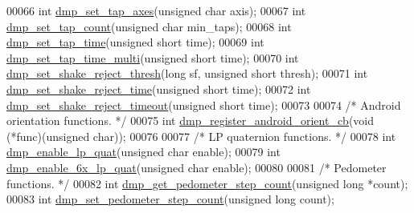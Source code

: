 \begin{DoxyCode}
00066 \textcolor{keywordtype}{int} \hyperlink{group___d_r_i_v_e_r_s_ga66bc5c8fc26fcb498df53fc62aa87e4f}{dmp\_set\_tap\_axes}(\textcolor{keywordtype}{unsigned} \textcolor{keywordtype}{char} axis);
00067 \textcolor{keywordtype}{int} \hyperlink{group___d_r_i_v_e_r_s_ga819f947b2cb107ada7b9a94c41be0dad}{dmp\_set\_tap\_count}(\textcolor{keywordtype}{unsigned} \textcolor{keywordtype}{char} min\_taps);
00068 \textcolor{keywordtype}{int} \hyperlink{group___d_r_i_v_e_r_s_ga97466067f4a23368f4d7e2547fe359d9}{dmp\_set\_tap\_time}(\textcolor{keywordtype}{unsigned} \textcolor{keywordtype}{short} time);
00069 \textcolor{keywordtype}{int} \hyperlink{group___d_r_i_v_e_r_s_gaeca250a90eb816eb2609229849481337}{dmp\_set\_tap\_time\_multi}(\textcolor{keywordtype}{unsigned} \textcolor{keywordtype}{short} time);
00070 \textcolor{keywordtype}{int} \hyperlink{group___d_r_i_v_e_r_s_ga62efdae1330d5bcaf4c75b069ded0ed0}{dmp\_set\_shake\_reject\_thresh}(\textcolor{keywordtype}{long} sf, \textcolor{keywordtype}{unsigned} \textcolor{keywordtype}{short} thresh);
00071 \textcolor{keywordtype}{int} \hyperlink{group___d_r_i_v_e_r_s_ga09d7a6d90e1bd2e907f1866d850c5608}{dmp\_set\_shake\_reject\_time}(\textcolor{keywordtype}{unsigned} \textcolor{keywordtype}{short} time);
00072 \textcolor{keywordtype}{int} \hyperlink{group___d_r_i_v_e_r_s_ga5d44d1a32535000e6902cdc5224d1b54}{dmp\_set\_shake\_reject\_timeout}(\textcolor{keywordtype}{unsigned} \textcolor{keywordtype}{short} time);
00073 
00074 \textcolor{comment}{/* Android orientation functions. */}
00075 \textcolor{keywordtype}{int} \hyperlink{group___d_r_i_v_e_r_s_ga2e66a02d29ec89466cf339587592943c}{dmp\_register\_android\_orient\_cb}(\textcolor{keywordtype}{void} (*func)(\textcolor{keywordtype}{unsigned} \textcolor{keywordtype}{char}));
00076 
00077 \textcolor{comment}{/* LP quaternion functions. */}
00078 \textcolor{keywordtype}{int} \hyperlink{group___d_r_i_v_e_r_s_ga4ee4339b79a58558d121ba8206056394}{dmp\_enable\_lp\_quat}(\textcolor{keywordtype}{unsigned} \textcolor{keywordtype}{char} enable);
00079 \textcolor{keywordtype}{int} \hyperlink{group___d_r_i_v_e_r_s_gaac712ef33727433f666b3861894873be}{dmp\_enable\_6x\_lp\_quat}(\textcolor{keywordtype}{unsigned} \textcolor{keywordtype}{char} enable);
00080 
00081 \textcolor{comment}{/* Pedometer functions. */}
00082 \textcolor{keywordtype}{int} \hyperlink{group___d_r_i_v_e_r_s_gad8f4d1a93e0f03d950559501c5a7255b}{dmp\_get\_pedometer\_step\_count}(\textcolor{keywordtype}{unsigned} \textcolor{keywordtype}{long} *count);
00083 \textcolor{keywordtype}{int} \hyperlink{group___d_r_i_v_e_r_s_ga568562c19998f585b1d2ba056cd209db}{dmp\_set\_pedometer\_step\_count}(\textcolor{keywordtype}{unsigned} \textcolor{keywordtype}{long} count);

\end{DoxyCode}
